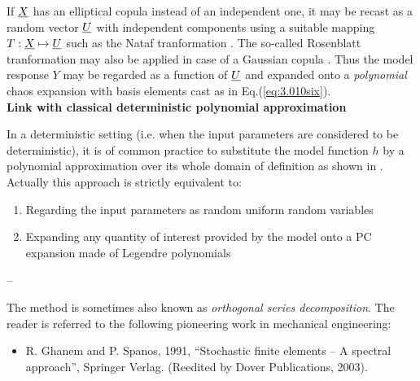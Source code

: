 {If $\underline X$ has an elliptical copula instead of an independent one, it may be recast as a random vector $\underline U$ with independent components using a suitable mapping $T : \underline X \mapsto \underline U$ such as the Nataf tranformation . The so-called Rosenblatt tranformation may also be applied in case of a Gaussian copula . Thus the model response $Y$ may be regarded as a function of $\underline U$ and expanded onto a \emph{polynomial} chaos expansion with basis elements cast as in Eq.(\ref{eq:3.010six}). \\

\textbf{Link with classical deterministic polynomial approximation} \vspace{2mm}

In a deterministic setting (i.e. when the input parameters are considered to be deterministic), it is of common practice to substitute the model function $h$ by a polynomial approximation over its whole domain of definition as shown in . Actually this approach is strictly equivalent to:
\begin{enumerate}
\item Regarding the input parameters as random uniform random variables
\item Expanding any quantity of interest provided by the model onto a PC expansion made of Legendre polynomials
\end{enumerate} 

}

{
  --
}

{
The method is sometimes also known as \emph{orthogonal series decomposition}. The reader is referred to the following pioneering work in mechanical engineering:
\begin{itemize}
  \item R. Ghanem and P. Spanos, 1991, ``Stochastic finite elements -- A spectral approach'', Springer Verlag. (Reedited by Dover Publications, 2003).
\end{itemize}
}

